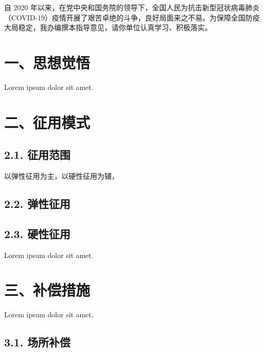



\pagestyle{plain}
\rmfamily
\normalsize
\raggedbottom



\vspace{20pt}

自 2020 年以来，在党中央和国务院的领导下，全国人民为抗击新型冠状病毒肺炎（COVID-19）疫情开展了艰苦卓绝的斗争，良好局面来之不易。为保障全国防疫大局稳定，我办编撰本指导意见，请你单位认真学习、积极落实。

\section*{一、思想觉悟}

Lorem ipsum dolor sit amet.

\section*{二、征用模式}

\subsection*{2.1. 征用范围}


以弹性征用为主，以硬性征用为辅，

\subsection*{2.2. 弹性征用}



\subsection*{2.3. 硬性征用}

Lorem ipsum dolor sit amet.

\section*{三、补偿措施}

Lorem ipsum dolor sit amet.

\subsection*{3.1. 场所补偿}

